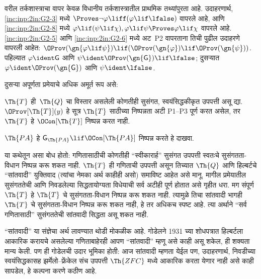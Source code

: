 वरील तर्कशास्त्राचा
वापर केवळ विधानीय
तर्कशास्त्रातील प्राथमिक
तथ्यांपुरता आहे.
उदाहरणार्थ,
\ref{inc:inp:2in:G2-3} मध्ये
$\Proves \lnot\varphi \liff (\varphi\lif
\lfalse)$ वापरले आहे,
आणि \ref{inc:inp:2in:G2-8} मध्ये
$\varphi \lif (\psi \lif \chi), \varphi \lif \psi
\Proves \varphi \lif \chi$ वापरले
आहे. \ref{inc:inp:2in:G2-5} आणि
\ref{inc:inp:2in:G2-6} मध्ये अट~P2
वापरताना तिची पुढील
उदाहरणे वापरली आहेत:
$\OProv(\gn{\varphi \lif \psi}) \lif
(\OProv(\gn{\varphi}) \lif \OProv(\gn{\psi}))$.
पहिल्यात $\varphi \ident
\mathsf{G}$ आणि $\psi \ident
\OProv(\gn{\mathsf{G}}) \lif \lfalse$;
दुसऱ्यात $\varphi
\ident \OProv(\gn{\mathsf{G}})$
आणि $\psi \ident \lfalse$.

दुसऱ्या अपूर्णता प्रमेयाचे
अधिक अमूर्त रूप असे:

\begin{thm}
\label{inc:inp:2in:thm:second-incompleteness-gen}
$\Th{T}$ ही~$\Th{Q}$ चा
विस्तार असलेली कोणतीही
सुसंगत, स्वयंसिद्धकीकृत
उपपत्ती असू द्या.
$\OProv[\Th{T}](y)$
हे सूत्र $\Th{T}$
साठीच्या
निष्पन्नता अटी
P1--P3 पूर्ण करत असेल,
तर $\Th{T}$ हे
$\OCon[\Th{T}]$
निष्पन्न करत नाही.
\end{thm}

\begin{prob}
$\Th{PA}$ हे
$\mathsf{G}_{\Th{PA}} \lif \OCon[\Th{PA}]$
निष्पन्न करते हे
दाखवा.
\end{prob}

\begin{digress}
या कथेतून असा बोध होतो:
गणितासाठीची कोणतीही
“स्वीकारार्ह” सुसंगत
उपपत्ती स्वतःचे
सुसंगतता-विधान
निष्पन्न करू शकत
नाही. $\Th{T}$ ही
गणिताची उपपत्ती असून
तिच्यात $\Th{Q}$ आणि
हिल्बर्टचे “सांतवादी”
युक्तिवाद (त्यांचा नेमका
अर्थ काहीही असो)
समाविष्ट आहेत असे
मानू. मागील प्रमेयातील सुसंगततेची आणि निवडलेल्या
सिद्धतायोग्यता विधेयाची सर्व अटीही पूर्ण होतात असे
गृहीत धरा. मग संपूर्ण
$\Th{T}$ हे
$\Th{T}$ चे
सुसंगतता-विधान
निष्पन्न करू
शकत नाही. त्यामुळे
तिचा सांतवादी भागही
$\Th{T}$ चे
सुसंगतता-विधान
निष्पन्न करू
शकत नाही, हे तर
अधिकच स्पष्ट आहे.
त्या अर्थाने
“सर्व गणितासाठी”
सुसंगततेची सांतवादी
सिद्धता असू शकत नाही.

“सांतवादी” या संज्ञेचा
अर्थ लावण्यात थोडी
मोकळीक आहे. गोडेलने
1931 च्या शोधपत्रात
हिल्बर्टला आकारिक
करायचे असलेल्या
गणिताबाहेरही आपण
“सांतवादी” म्हणू
असे काही असू शकेल,
ही शक्यता मान्य केली.
पण ही गोडेलची
उदार भूमिका होती:
आज सांतवादी म्हणता
येईल पण, उदाहरणार्थ,
निवडीच्या स्वयंसिद्धकासह
झर्मेलो--फ्रेंकेल संच
उपपत्ती $\Th{ZFC}$
मध्ये आकारिक करता
येणार नाही असे
काही सापडेल, हे
कल्पना करणे कठीण आहे.
\end{digress}












